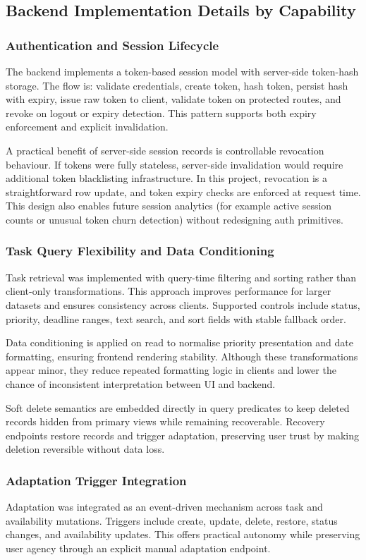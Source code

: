 \documentclass[12pt]{article}
\begin{document}
\subsection{Backend Implementation Details by Capability}
\subsubsection{Authentication and Session Lifecycle}
The backend implements a token-based session model with server-side token-hash storage. The flow is: validate credentials, create token, hash token, persist hash with expiry, issue raw token to client, validate token on protected routes, and revoke on logout or expiry detection. This pattern supports both expiry enforcement and explicit invalidation.

A practical benefit of server-side session records is controllable revocation behaviour. If tokens were fully stateless, server-side invalidation would require additional token blacklisting infrastructure. In this project, revocation is a straightforward row update, and token expiry checks are enforced at request time. This design also enables future session analytics (for example active session counts or unusual token churn detection) without redesigning auth primitives.

\subsubsection{Task Query Flexibility and Data Conditioning}
Task retrieval was implemented with query-time filtering and sorting rather than client-only transformations. This approach improves performance for larger datasets and ensures consistency across clients. Supported controls include status, priority, deadline ranges, text search, and sort fields with stable fallback order.

Data conditioning is applied on read to normalise priority presentation and date formatting, ensuring frontend rendering stability. Although these transformations appear minor, they reduce repeated formatting logic in clients and lower the chance of inconsistent interpretation between UI and backend.

Soft delete semantics are embedded directly in query predicates to keep deleted records hidden from primary views while remaining recoverable. Recovery endpoints restore records and trigger adaptation, preserving user trust by making deletion reversible without data loss.

\subsubsection{Adaptation Trigger Integration}
Adaptation was integrated as an event-driven mechanism across task and availability mutations. Triggers include create, update, delete, restore, status changes, and availability updates. This offers practical autonomy while preserving user agency through an explicit manual adaptation endpoint.
\end{document}
